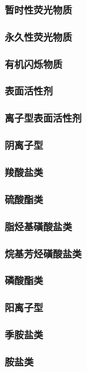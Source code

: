 \documentclass[UTF8]{../../ApplicationUniverse}
\begin{document}
    \subsubsection{暂时性荧光物质}
    \subsubsection{永久性荧光物质}
    \subsubsection{有机闪烁物质}
\subsubsection{表面活性剂}
    \subsubsection{离子型表面活性剂}
        \subsubsection{阴离子型}
            \subsubsection{羧酸盐类}
            \subsubsection{硫酸酯类}
            \subsubsection{脂烃基磺酸盐类}
            \subsubsection{烷基芳烃磺酸盐类}
            \subsubsection{磷酸酯类}
        \subsubsection{阳离子型}
            \subsubsection{季胺盐类}
            \subsubsection{胺盐类}
\end{document}
